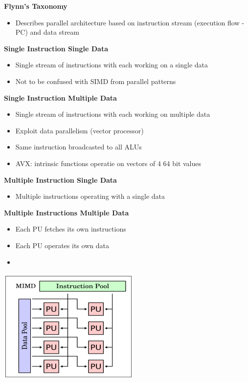 \documentclass[10pt, landscape]{article}
\begin{document}
\begin{multicols}{4}
\textbf{Flynn's Taxonomy}
\begin{itemize}
    \item Describes parallel architecture based on instruction stream (execution flow - PC) and data stream
\end{itemize}

\textbf{Single Instruction Single Data}
\begin{itemize}
    \item Single stream of instructions with each working on a single data 
    \item Not to be confused with SIMD from parallel patterns
\end{itemize}

\textbf{Single Instruction Multiple Data}
\begin{itemize}
    \item Single stream of instructions with each working on multiple data 
    \item Exploit data parallelism (vector processor)
    \item Same instruction broadcasted to all ALUs
    \item AVX: intrinsic functions operatie on vectors of 4 64 bit values 
\end{itemize}

\textbf{Multiple Instruction Single Data}
\begin{itemize}
    \item Multiple instructions operating with a single data 
\end{itemize}

\textbf{Multiple Instructions Multiple Data}
\begin{itemize}
    \item Each PU fetches its  own instructions 
    \item Each PU operates its own data 
    \item  
\end{itemize}
\includegraphics*[width=7cm]{mimd}


\end{multicols}
\end{document}
